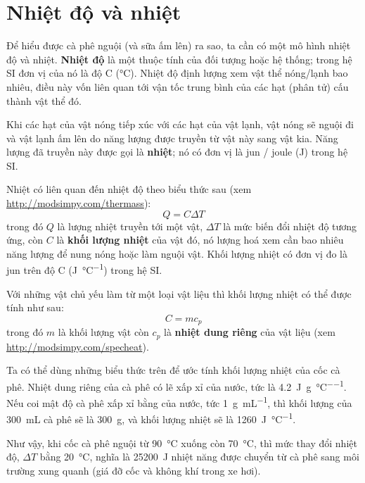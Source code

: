 \documentclass[12pt, openany]{book}
\theoremstyle{exercise}
\begin{document}
\section{Nhiệt độ và nhiệt}

Để hiểu được cà phê nguội (và sữa ấm lên) ra sao, ta cần có một mô hình nhiệt độ và nhiệt.  {\bf Nhiệt độ} là một thuộc tính của đối tượng hoặc hệ thống; trong hệ SI đơn vị của nó là độ C (\si{\celsius}).  Nhiệt độ định lượng xem vật thể nóng/lạnh bao nhiêu, điều này vốn liên quan tới vận tốc trung bình của các hạt (phân tử) cấu thành vật thể đó.


Khi các hạt của vật nóng tiếp xúc với các hạt của vật lạnh, vật nóng sẽ nguội đi và vật lạnh ấm lên do năng lượng được truyền từ vật này sang vật kia. Năng lượng đã truyền này được gọi là {\bf nhiệt}; nó có đơn vị là jun / joule (\si{\joule}) trong hệ SI.


Nhiệt có liên quan đến nhiệt độ theo biểu thức sau (xem \url{http://modsimpy.com/thermass}):
%
\[ Q = C \Delta T \]
%
trong đó $Q$ là lượng nhiệt truyền tới một vật, $\Delta T$ là mức biến đổi nhiệt độ tương ứng, còn $C$ là {\bf khối lượng nhiệt} của vật đó, nó lượng hoá xem cần bao nhiêu năng lượng để nung nóng hoặc làm nguội vật. Khối lượng nhiệt có đơn vị đo là jun trên độ C (\si{\joule\per\celsius}) trong hệ SI.


Với những vật chủ yếu làm từ một loại vật liệu thì khối lượng nhiệt có thể được tính như sau:
%
\[ C = m c_p \]
%
trong đó $m$ là khối lượng vật còn $c_p$ là {\bf nhiệt dung riêng} của vật liệu (xem \url{http://modsimpy.com/specheat}).


Ta có thể dùng những biểu thức trên để ước tính khối lượng nhiệt của cốc cà phê. Nhiệt dung riêng của cà phê có lẽ xấp xỉ của nước, tức là \SI{4.2}{\joule\per\gram\per\celsius}.  Nếu coi mật độ cà phê xấp xỉ bằng của nước, tức \SI{1}{\gram\per\milli\liter}, thì khối lượng của \SI{300}{\milli\liter} cà phê sẽ là \SI{300}{\gram}, và khối lượng nhiệt sẽ là \SI{1260}{\joule\per\celsius}.


Như vậy, khi cốc cà phê nguội từ \SI{90}{\celsius} xuống còn \SI{70}{\celsius}, thì mức thay đổi nhiệt độ, $\Delta T$ bằng \SI{20}{\celsius}, nghĩa là \SI{25200}{\joule} nhiệt năng được chuyển từ cà phê sang môi trường xung quanh (giá đỡ cốc và không khí trong xe hơi).
\end{document}
